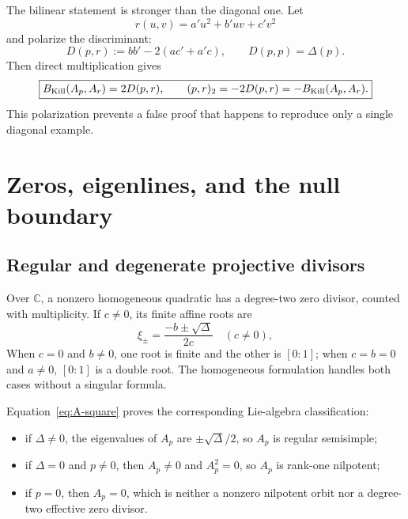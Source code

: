 \documentclass[11pt]{article}
\numberwithin{equation}{section}
\newcommand{\CC}{\mathbb C}
\begin{document}
The bilinear statement is stronger than the diagonal one.  Let
\begin{equation}
 r(u,v)=a'u^2+b'uv+c'v^2
\end{equation}
and polarize the discriminant:
\begin{equation}
 D(p,r):=bb'-2(ac'+a'c),
 \qquad D(p,p)=\Delta(p).
 \label{eq:polar-discriminant}
\end{equation}
Then direct multiplication gives
\begin{equation}
 \boxed{
 B_{\rm Kill}(A_p,A_r)=2D(p,r),
 \qquad (p,r)_2=-2D(p,r)=-B_{\rm Kill}(A_p,A_r).}
 \label{eq:polar-identities}
\end{equation}
This polarization prevents a false proof that happens to reproduce only a
single diagonal example.

\section{Zeros, eigenlines, and the null boundary}

\subsection{Regular and degenerate projective divisors}

Over \(\CC\), a nonzero homogeneous quadratic has a degree-two zero divisor,
counted with multiplicity.  If \(c\ne0\), its finite affine roots are
\begin{equation}
 \xi_{\pm}=\frac{-b\pm\sqrt{\Delta}}{2c}
 \quad(c\ne0),
 \label{eq:affine-roots}
\end{equation}
When \(c=0\) and \(b\ne0\), one root is finite and the other is
\([0:1]\); when \(c=b=0\) and \(a\ne0\), \([0:1]\) is a double root.
The homogeneous formulation handles both cases without a singular formula.

Equation~\eqref{eq:A-square} proves the corresponding Lie-algebra
classification:
\begin{itemize}
\item if \(\Delta\ne0\), the eigenvalues of \(A_p\) are
\(\pm\sqrt{\Delta}/2\), so \(A_p\) is regular semisimple;
\item if \(\Delta=0\) and \(p\ne0\), then \(A_p\ne0\) and \(A_p^2=0\), so
\(A_p\) is rank-one nilpotent;
\item if \(p=0\), then \(A_p=0\), which is neither a nonzero nilpotent orbit
nor a degree-two effective zero divisor.
\end{itemize}
\end{document}
